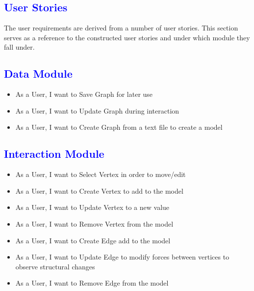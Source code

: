 \documentclass[12pt]{article}
\begin{document}
\newpage
{}
\thispagestyle{empty}
\tableofcontents
\clearpage

\textcolor{blue}{\section{User Stories}}
\begin{flushleft}
	The user requirements are derived from a number of user stories. This section serves as a reference to the constructed user stories and under which module they fall under.	
	
	\textcolor{blue}{\subsection{Data Module}}	
	\begin{flushleft}
	\begin{itemize}
	\item As a User, I want to Save Graph for later use
	\item As a User, I want to Update Graph during interaction
	\item As a User, I want to Create Graph from a text file to create a model
	\end{itemize}	
	\end{flushleft}
	
	\textcolor{blue}{\subsection{Interaction Module}}	
	\begin{flushleft}
	\begin{itemize}
	\item As a User, I want to Select Vertex in order to move/edit
	\item As a User, I want to Create Vertex to add to the model
	\item As a User, I want to Update Vertex to a new value
	\item As a User, I want to Remove Vertex from the model
	\item As a User, I want to Create Edge add to the model
	\item As a User, I want to Update Edge to modify forces between vertices to observe structural changes
	\item As a User, I want to Remove Edge from the model
	\end{itemize}	
	\end{flushleft}
	

\end{flushleft}
\end{document}
